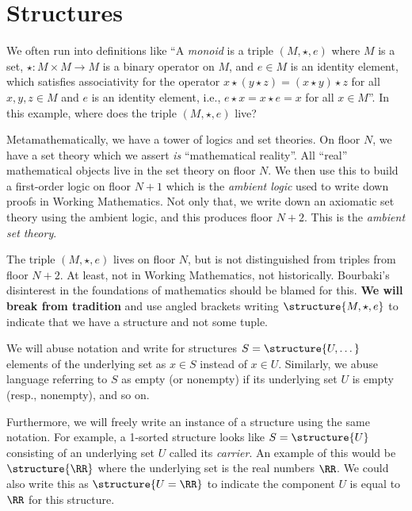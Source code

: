 
\chapter{Structures}

\begin{remark}
We often run into definitions like ``A \emph{monoid} is a triple
$(M,\star,e)$ where $M$ is a set, $\star\colon M\times M\to M$ is a
binary operator on $M$, and $e\in M$ is an identity element, which
satisfies associativity for the operator
$x\star(y\star z)=(x\star y)\star z$ for all $x,y,z\in M$
and $e$ is an identity element, i.e., $e\star x=x\star e=x$ for all
$x\in M$''. In this example, where does the triple $(M,\star,e)$ live?

Metamathematically, we have a tower of logics and set theories. On
floor $N$, we have a set theory which we assert \emph{is}
``mathematical reality''. All ``real'' mathematical objects live in
the set theory on floor $N$. We then use this to build a first-order
logic on floor $N+1$ which is the \emph{ambient logic} used to write
down proofs in Working Mathematics. Not only that, we write down an
axiomatic set theory using the ambient logic, and this produces floor
$N+2$. This is the \emph{ambient set theory}.

The triple $(M,\star,e)$ lives on floor $N$, but is not distinguished
from triples from floor $N+2$. At least, not in Working Mathematics,
not historically. Bourbaki's disinterest in the foundations of
mathematics should be blamed for this. \textbf{We will break from tradition}
and use angled brackets writing $\structure{M,\star,e}$ to indicate
that we have a structure and not some tuple.
\end{remark}

\begin{remark}
We will abuse notation and write for structures $S=\structure{U,\dots}$
elements of the underlying set as $x\in S$ instead of $x\in U$.
Similarly, we abuse language referring to $S$ as empty (or nonempty)
if its underlying set $U$ is empty (resp., nonempty), and so on.

Furthermore, we will freely write an instance of a structure using the
same notation. For example, a 1-sorted structure looks like
$S=\structure{U}$ consisting of an underlying set $U$ called its
\emph{carrier}. An example of this would be $\structure{\RR}$ where
the underlying set is the real numbers $\RR$. We could also write this
as $\structure{U = \RR}$ to indicate the component $U$ is equal to
$\RR$ for this structure.
\end{remark}

